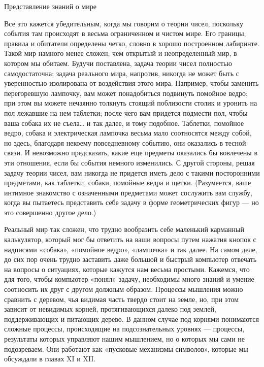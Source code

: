\documentclass[../main.tex]{subfiles}
\begin{document}
Представление знаний о мире

Все это кажется убедительным, когда мы говорим о теории чисел, поскольку события там происходят в весьма ограниченном и чистом мире. Его границы, правила и обитатели определены четко, словно в хорошо построенном лабиринте. Такой мир намного менее сложен, чем открытый и неопределенный мир, в котором мы обитаем. Будучи поставлена, задача теории чисел полностью самодостаточна; задача реального мира, напротив, никогда не может быть с уверенностью изолирована от воздействия этого мира. Например, чтобы заменить перегоревшую лампочку, вам может понадобиться подвинуть помойное ведро; при этом вы можете нечаянно толкнуть стоящий поблизости столик и уронить на пол лежавшие на нем таблетки; после чего вам придется подмести пол, чтобы ваша собака их не съела\ldots{} и так далее, и тому подобное. Таблетки, помойное ведро, собака и электрическая лампочка весьма мало соотносятся между собой, но здесь, благодаря некоему повседневному событию, они оказались в тесной связи. И невозможно предсказать, какие еще предметы оказались бы вовлечены в эти отношения, если бы события немного изменились. С другой стороны, решая задачу теории чисел, вам никогда не придется иметь дело с такими посторонними предметами, как таблетки, собаки, помойные ведра и щетки. (Разумеется, ваше интимное знакомство с означенными предметами может сослужить вам службу, когда вы пытаетесь представить себе задачу в форме геометрических фигур --- но это совершенно другое дело.)

Реальный мир так сложен, что трудно вообразить себе маленький карманный калькулятор, который мог бы ответить на ваши вопросы путем нажатия кнопок с надписями «собака», «помойное ведро», «лампочка» и так далее. На самом деле, до сих пор очень трудно заставить даже большой и быстрый компьютер отвечать на вопросы о ситуациях, которые кажутся нам весьма простыми. Кажемся, что для того, чтобы компьютер «понял» задачу, необходимы много знаний и умение соотносить их друг с другом должным образом. Процессы мышления можно сравнить с деревом, чья видимая часть твердо стоит на земле, но, при этом зависит от невидимых корней, протягивающихся далеко под землей, поддерживающих и питающих дерево. В данном случае под корнями понимаются сложные процессы, происходящие на подсознательных уровнях --- процессы, результаты которых управляют нашим мышлением, но о которых мы сами не подозреваем. Они работают как «пусковые механизмы символов», которые мы обсуждали в главах XI и XII.
\end{document}
